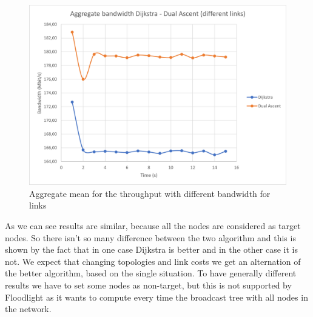 \begin{figure}
	\centering
	\includegraphics[width=\textwidth]{img/aggregate-band-div.png}
	\caption{Aggregate mean for the throughput with different
	bandwidth for links}\label{fig:band-aggregate-div}
\end{figure}

As we can see results are similar, because all the nodes are considered as
target nodes. So there isn't so many difference between the two algorithm and
this is shown by the fact that in one case Dijkstra is better and in the other
case it is not. We expect that changing topologies and link costs we get an
alternation of the better algorithm, based on the single situation. To have
generally different results we have to set some nodes as non-target, but this is
not supported by Floodlight as it wants to compute every time the broadcast tree
with all nodes in the network.
